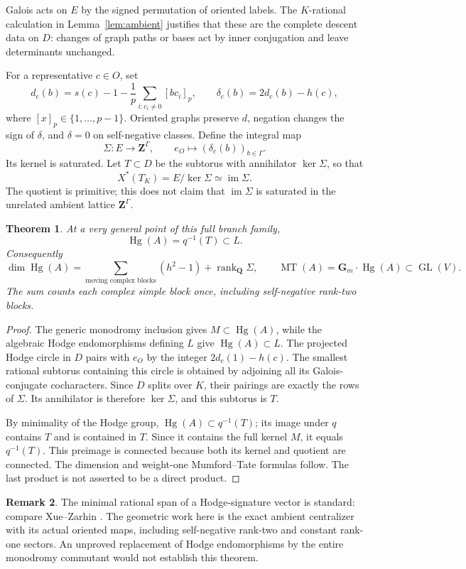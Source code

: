 \documentclass[11pt]{article}
\newtheorem{theorem}{Theorem}[section]
\theoremstyle{definition}
\newtheorem{remark}[theorem]{Remark}
\newcommand{\Q}{\mathbf Q}
\newcommand{\Z}{\mathbf Z}
\newcommand{\GL}{\operatorname{GL}}
\newcommand{\Hg}{\operatorname{Hg}}
\newcommand{\MT}{\operatorname{MT}}
\newcommand{\im}{\operatorname{im}}
\newcommand{\Gm}{\mathbf G_m}
\begin{document}
Galois acts on $E$ by the signed permutation of oriented labels. The
$K$-rational calculation in Lemma~\ref{lem:ambient} justifies that these
are the complete descent data on $D$: changes of graph paths or bases act
by inner conjugation and leave determinants unchanged.

For a representative $c\in O$, set
\[
 d_c(b)=s(c)-1-\frac1p\sum_{i:c_i\ne0}[bc_i]_p,
 \qquad \delta_c(b)=2d_c(b)-h(c),
\]
where $[x]_p\in\{1,\ldots,p-1\}$. Oriented graphs preserve $d$,
negation changes the sign of $\delta$, and $\delta=0$ on self-negative
classes. Define the integral map
\[
 \Sigma:E\longrightarrow\Z^\Gamma,
 \qquad e_O\longmapsto(\delta_c(b))_{b\in\Gamma}.
\]
Its kernel is saturated. Let $T\subset D$ be the subtorus with annihilator
$\ker\Sigma$, so that
\[
 X^*(T_K)=E/\ker\Sigma\simeq\im\Sigma.
\]
The quotient is primitive; this does not claim that $\im\Sigma$ is
saturated in the unrelated ambient lattice $\Z^\Gamma$.

\begin{theorem}\label{thm:hg}
At a very general point of this full branch family,
\[
                  \Hg(A)=q^{-1}(T)\subset L.
\]
Consequently
\[
 \dim\Hg(A)=\sum_{\text{moving complex blocks}}(h^2-1)
                       +\operatorname{rank}_{\Q}\Sigma,
 \qquad \MT(A)=\Gm\cdot\Hg(A)\subset\GL(V).
\]
The sum counts each complex simple block once, including self-negative
rank-two blocks.
\end{theorem}
\begin{proof}
The generic monodromy inclusion gives $M\subset\Hg(A)$, while the
algebraic Hodge endomorphisms defining $L$ give $\Hg(A)\subset L$.
The projected Hodge circle in $D$ pairs with $e_O$ by the integer
$2d_c(1)-h(c)$. The smallest rational subtorus containing this circle is
obtained by adjoining all its Galois-conjugate cocharacters. Since $D$
splits over $K$, their pairings are exactly the rows of $\Sigma$.
Its annihilator is therefore $\ker\Sigma$, and this subtorus is $T$.

By minimality of the Hodge group, $\Hg(A)\subset q^{-1}(T)$; its image
under $q$ contains $T$ and is contained in $T$. Since it contains the full
kernel $M$, it equals $q^{-1}(T)$. This preimage is connected because
both its kernel and quotient are connected. The dimension and weight-one
Mumford--Tate formulas follow. The last product is not asserted to be a
direct product.
\end{proof}

\begin{remark}
The minimal rational span of a Hodge-signature vector is standard: compare
Xue--Zarhin \cite[Lemma 3.9, Theorem 3.11 and Section 3.13]{XZ}.
The geometric work here is the exact ambient centralizer with its actual
oriented maps, including self-negative rank-two and constant rank-one
sectors. An unproved replacement of Hodge endomorphisms by the entire
monodromy commutant would not establish this theorem.
\end{remark}
\end{document}
